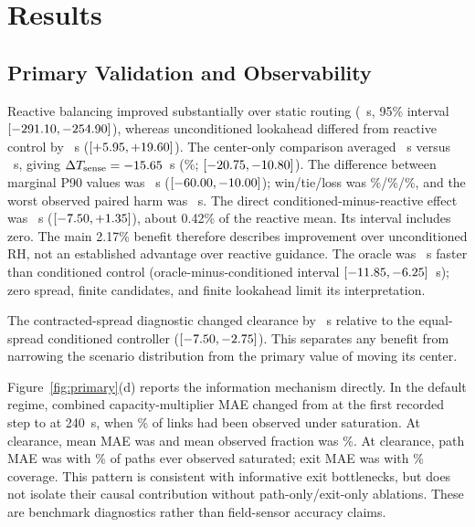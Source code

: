 \documentclass[conference]{IEEEtran}
\begin{document}
\section{Results}
\subsection{Primary Validation and Observability}
Reactive balancing improved substantially over static routing (\DynamicDiff~s, 95\% interval $[-291.10,-254.90]$), whereas unconditioned lookahead differed from reactive control by \PlanningDiff~s ($[+5.95,+19.60]$). The center-only comparison averaged \CondMean~s versus \UncondMean~s, giving $\Delta T_{\rm sense}=-15.65$~s (\PrimaryPct\%; $[-20.75,-10.80]$). The difference between marginal P90 values was \PrimaryPninetyDiff~s ($[-60.00,-10.00]$); win/tie/loss was \PrimaryWin\%/\PrimaryTie\%/\PrimaryLoss\%, and the worst observed paired harm was \WorstHarm~s. The direct conditioned-minus-reactive effect was \SystemDiff~s ($[-7.50,+1.35]$), about 0.42\% of the reactive mean. Its interval includes zero. The main 2.17\% benefit therefore describes improvement over unconditioned RH, not an established advantage over reactive guidance. The oracle was \OracleGapReduction~s faster than conditioned control (oracle-minus-conditioned interval $[-11.85,-6.25]$~s); zero spread, finite candidates, and finite lookahead limit its interpretation.

The contracted-spread diagnostic changed clearance by \SpreadDiff~s relative to the equal-spread conditioned controller ($[-7.50,-2.75]$). This separates any benefit from narrowing the scenario distribution from the primary value of moving its center.

Figure~\ref{fig:primary}(d) reports the information mechanism directly. In the default regime, combined capacity-multiplier MAE changed from \EstimatorInitialMAE{} at the first recorded step to \EstimatorMAETwoForty{} at 240~s, when \EstimatorObservedTwoForty\% of links had been observed under saturation. At clearance, mean MAE was \EstimatorFinalMAE{} and mean observed fraction was \EstimatorFinalObserved\%. At clearance, path MAE was \PathFinalMAE{} with \PathObservedPct\% of paths ever observed saturated; exit MAE was \ExitFinalMAE{} with \ExitObservedPct\% coverage. This pattern is consistent with informative exit bottlenecks, but does not isolate their causal contribution without path-only/exit-only ablations. These are benchmark diagnostics rather than field-sensor accuracy claims.
\end{document}
